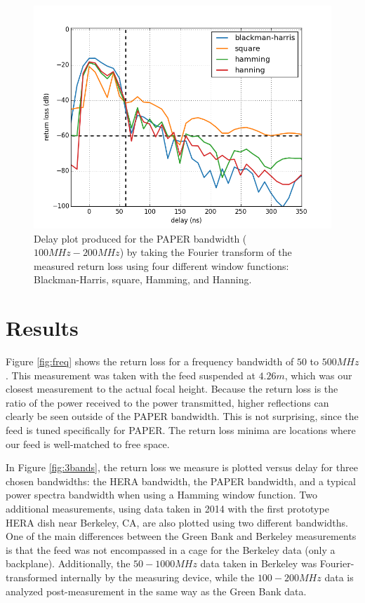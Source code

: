 \documentclass[12pt,preprint]{aastex}
\begin{document}
\begin{figure}[H]
\centering
\includegraphics[totalheight=0.41\textheight]{plots/bh_vs_sq.png}
\caption{Delay plot produced for the PAPER bandwidth ($100MHz-200MHz$) by taking the Fourier transform of the measured return loss using four different window functions: Blackman-Harris, square, Hamming, and Hanning.}
\label{fig:window}
\end{figure}

\section{Results}

Figure \ref{fig:freq} shows the return loss for a frequency bandwidth of $50$ to
$500MHz$. This measurement was taken with the feed suspended at $4.26m$, which
was our closest measurement to the actual focal height.  Because the return
loss is the ratio of the power received to the power transmitted, higher
reflections can clearly be seen outside of the PAPER bandwidth. This is not
surprising, since the feed is tuned specifically for PAPER. The return loss
minima are locations where our feed is well-matched to free space.

In Figure \ref{fig:3bands}, the return loss we measure is plotted versus delay
for three chosen bandwidths: the HERA bandwidth, the PAPER bandwidth, and a
typical power spectra bandwidth when using a Hamming window function. Two
additional measurements, using data taken in 2014 with the first prototype HERA
dish near Berkeley, CA, are also plotted using two different bandwidths. One of
the main differences between the Green Bank and Berkeley measurements is that
the feed was not encompassed in a cage for the Berkeley data (only a backplane). Additionally, the $50-1000MHz$ data taken in Berkeley was
Fourier-transformed internally by the measuring device, while the $100-200MHz$
data is analyzed post-measurement in the same way as the Green Bank data. 
\end{document}
